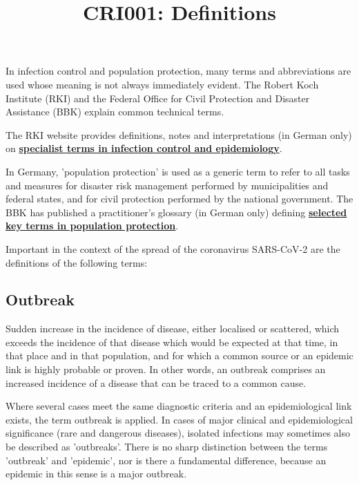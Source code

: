 \documentclass{article}
\begin{document}
\title{CRI001: Definitions}

\maketitle


In infection control and population protection, many terms and abbreviations are used whose meaning is not always immediately evident. The Robert Koch Institute (RKI) and the Federal Office for Civil Protection and Disaster Assistance (BBK) explain common technical terms.


The RKI website provides definitions, notes and interpretations (in German only) on \textbf{\href{https://www.rki.de/DE/Content/Service/Publikationen/Fachwoerterbuch_Infektionsschutz.pdf}{specialist terms in infection control and epidemiology}}.


In Germany, 'population protection' is used as a generic term to refer to all tasks and measures for disaster risk management performed by municipalities and federal states, and for civil protection performed by the national government. The BBK has published a practitioner's glossary (in German only) defining \textbf{\href{https://www.bbk.bund.de/SharedDocs/Downloads/BBK/DE/Publikationen/Praxis_Bevoelkerungsschutz/Glossar_2018.pdf}{selected key terms in population protection}}.


Important in the context of the spread of the coronavirus SARS-CoV-2 are the definitions of the following terms:


\subsection{Outbreak}\label{H3878242}



Sudden increase in the incidence of disease, either localised or scattered, which exceeds the incidence of that disease which would be expected at that time, in that place and in that population, and for which a common source or an epidemic link is highly probable or proven. In other words, an outbreak comprises an increased incidence of a disease that can be traced to a common cause.


Where several cases meet the same diagnostic criteria and an epidemiological link exists, the term outbreak is applied. In cases of major clinical and epidemiological significance (rare and dangerous diseases), isolated infections may sometimes also be described as 'outbreaks'. There is no sharp distinction between the terms 'outbreak' and 'epidemic', nor is there a fundamental difference, because an epidemic in this sense is a major outbreak.
\end{document}
